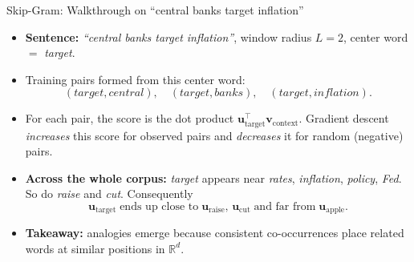\documentclass[10pt,english,aspectratio=169]{beamer}
\begin{document}
\begin{frame}{Skip-Gram: Walkthrough on ``central banks target inflation''}
\begin{itemize}
\item \textbf{Sentence:} \emph{``central banks target inflation''}, window radius $L = 2$, center word $=$ \emph{target}.

\medskip
\item Training pairs formed from this center word:
\[
(\textit{target}, \textit{central}), \quad (\textit{target}, \textit{banks}), \quad (\textit{target}, \textit{inflation}).
\]

\medskip
\item For each pair, the score is the dot product $\mathbf{u}_{\text{target}}^{\top} \mathbf{v}_{\text{context}}$. Gradient descent \emph{increases} this score for observed pairs and \emph{decreases} it for random (negative) pairs.

\medskip
\item \textbf{Across the whole corpus:} \emph{target} appears near \emph{rates}, \emph{inflation}, \emph{policy}, \emph{Fed}. So do \emph{raise} and \emph{cut}. Consequently
\[
\mathbf{u}_{\text{target}} \;\text{ends up close to}\; \mathbf{u}_{\text{raise}},\, \mathbf{u}_{\text{cut}} \;\text{and far from}\; \mathbf{u}_{\text{apple}}.
\]

\medskip
\item \textbf{Takeaway:} analogies emerge because consistent co-occurrences place related words at similar positions in $\mathbb{R}^{d}$.
\end{itemize}
\end{frame}
\end{document}
